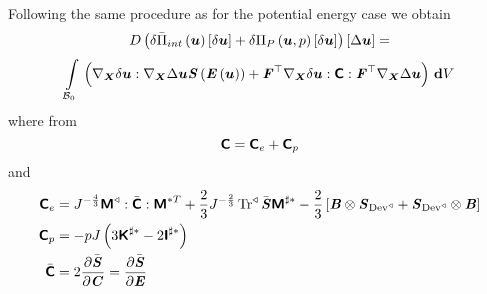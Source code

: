 Following the same procedure as for the potential energy case we obtain
\begin{multline}
  \directionalderiv{}{\variation{\fnof{\bar{\Pi}_{int}}{\vectr{u}}}{\vectr{u}}+\variation{\fnof{\Pi_{P}}{\vectr{u},p}}{\vectr{u}}}{\linearisationdir{\vectr{u}}}=\\
  \gint{\embedmanifold{B}_{0}}{}{\pbrac{\doubledotprod{\gradient{\vectr{X}}{\variationdir{\vectr{u}}}}{\gradient{\vectr{X}}{\linearisationdir{\vectr{u}}}\fnof{\tensor{S}}{\fnof{\tensor{E}}{\vectr{u}}}}+\doubledotprod{\transpose{\tensortwo{F}}\gradient{\vectr{X}}{\variationdir{\vectr{u}}}}{\doubledotprod{\tensorfour{C}}{\transpose{\tensortwo{F}}\gradient{\vectr{X}}{\linearisationdir{\vectr{u}}}}}}}{V}
\end{multline}
where from 
\begin{equation}
  \boldsymbol{\mathsf{C}}=\boldsymbol{\mathsf{C}}_{e}+\boldsymbol{\mathsf{C}}_{p}
\end{equation}
and
\begin{equation}
  \begin{split}
    \boldsymbol{\mathsf{C}}_{e}&=J^{-\frac{4}{3}}  \boldsymbol{\mathsf{M}}^{\triangleleft}  : \bar{\boldsymbol{\mathsf{C}}} : \boldsymbol{\mathsf{M}}^{*T} +\dfrac{2}{3}J^{-\frac{2}{3}} \operatorname{Tr}^{\triangleleft} \bar{\boldsymbol{\mathit{S}}}\boldsymbol{\mathsf{M}}^{\sharp *}
    -\dfrac{2}{3}\left[  \boldsymbol{\mathit{B}} \otimes \boldsymbol{\mathit{S}}_{ \operatorname{Dev}^{\triangleleft} } + \boldsymbol{\mathit{S}}_{ \operatorname{Dev}^{\triangleleft} } \otimes \boldsymbol{\mathit{B}}  \right]\\
    \boldsymbol{\mathsf{C}}_{p}&=-pJ\left( 3\boldsymbol{\mathsf{K}}^{\sharp *}-2\boldsymbol{\mathsf{I}}^{\sharp *} \right)\\
    \bar{\boldsymbol{\mathsf{C}}}&=2 \dfrac{\partial \bar{\boldsymbol{\mathit{S}}}}{\partial \boldsymbol{\mathit{C}}} = \dfrac{\partial \bar{\boldsymbol{\mathit{S}}}}{\partial \boldsymbol{\mathit{E}}} 
  \end{split}
\end{equation}

